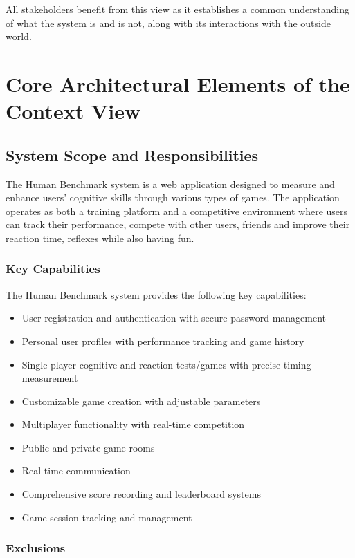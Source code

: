All stakeholders benefit from this view as it establishes a common understanding of what the system is and is not, along with its interactions with the outside world.

\section{Core Architectural Elements of the Context View}

\subsection{System Scope and Responsibilities}

The Human Benchmark system is a web application designed to measure and enhance users' 
cognitive skills through various types of games. 
The application operates as both a training platform and a competitive environment where users can track their performance, compete with other users, friends and improve their reaction time, reflexes while also having fun.

\subsubsection{Key Capabilities}

The Human Benchmark system provides the following key capabilities:

\begin{itemize}
    \item User registration and authentication with secure password management
    \item Personal user profiles with performance tracking and game history
    \item Single-player cognitive and reaction tests/games with precise timing measurement
    \item Customizable game creation with adjustable parameters
    \item Multiplayer functionality with real-time competition
    \item Public and private game rooms
    \item Real-time communication
    \item Comprehensive score recording and leaderboard systems
    \item Game session tracking and management
\end{itemize}

\subsubsection{Exclusions}


